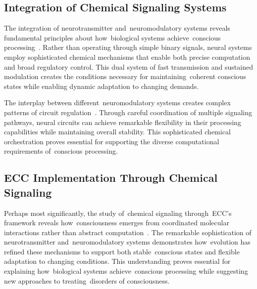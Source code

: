\subsection*{Integration of Chemical Signaling Systems~}

The integration of neurotransmitter and~neuromodulatory systems reveals fundamental principles about how~biological systems achieve~conscious processing~\cite{Picciotto2012, hunt2024electromagnetic}. Rather than operating through simple binary signals, neural systems employ sophisticated chemical mechanisms that enable both precise computation and broad regulatory control. This dual system of fast transmission and sustained modulation creates the conditions necessary for maintaining~coherent conscious states while enabling dynamic adaptation to changing demands.

The interplay between different~neuromodulatory systems creates complex patterns of circuit regulation~\cite{Cools2011, pinotsis2023cytoelectric}. Through careful coordination of multiple signaling pathways, neural circuits can achieve remarkable flexibility in their processing capabilities while maintaining overall stability. This sophisticated chemical orchestration proves essential for supporting the diverse computational requirements of~conscious processing.

\subsection*{ECC Implementation Through Chemical Signaling~}

Perhaps most significantly, the study of~chemical signaling through~ECC's framework reveals how~consciousness emerges from coordinated molecular interactions rather than abstract computation~\cite{Marder2012, Hameroff2014}. The remarkable sophistication of neurotransmitter and~neuromodulatory systems demonstrates how~evolution has refined these mechanisms to support both stable~conscious states and flexible adaptation to changing conditions. This understanding proves essential for explaining how~biological systems achieve~conscious processing while suggesting new approaches to treating~disorders of consciousness.


